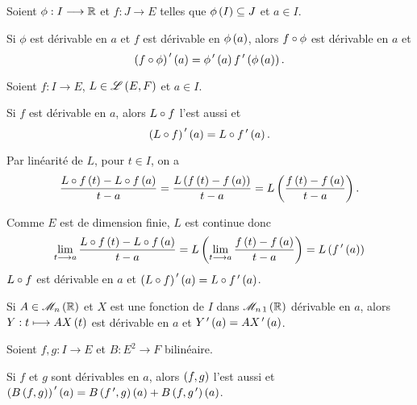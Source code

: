 \begin{prop}
Soient \(\phi:I\longrightarrow\mathbb{R}\) et \(f:J\to E\) telles que \(\phi\left(I\right)\subseteq J\) et \(a\in I\).

Si \(\phi\) est dérivable en \(a\) et \(f\) est dérivable en \(\phi\left(a\right)\), alors \(f\circ\phi\) est dérivable en \(a\) et \[\left(f\circ\phi\right)^{\,\prime}\left(a\right)=\phi^{\,\prime}\left(a\right)f^{\,\prime}\left(\phi\left(a\right)\right).\]
\end{prop}

\begin{prop}
Soient \(f:I\to E\), \(L\in\mathscr{L}\left(E,F\right)\) et \(a\in I\).

Si \(f\) est dérivable en \(a\), alors \(L\circ f\) l'est aussi et \[\left(L\circ f\right)^{\,\prime}\left(a\right)=L\circ f^{\,\prime}\left(a\right).\]
\end{prop}

\begin{dem}
Par linéarité de \(L\), pour \(t\in I\), on a \[\dfrac{L\circ f\left(t\right)-L\circ f\left(a\right)}{t-a}=\dfrac{L\left(f\left(t\right)-f\left(a\right)\right)}{t-a}=L\left(\dfrac{f\left(t\right)-f\left(a\right)}{t-a}\right).\]

Comme \(E\) est de dimension finie, \(L\) est continue donc \[\lim_{t\longrightarrow a}\dfrac{L\circ f\left(t\right)-L\circ f\left(a\right)}{t-a}=L\left(\lim_{t\longrightarrow a}\dfrac{f\left(t\right)-f\left(a\right)}{t-a}\right)=L\left(f^{\,\prime}\left(a\right)\right)\] \ie \(L\circ f\) est dérivable en \(a\) et \(\left(L\circ f\right)^{\,\prime}\left(a\right)=L\circ f^{\,\prime}\left(a\right)\).
\end{dem}

\begin{ex}
Si \(A\in\M{n}[\R]\) et \(X\) est une fonction de \(I\) dans \(\M{n\,1}[\R]\) dérivable en \(a\), alors \(Y:t\longmapsto AX\left(t\right)\) est dérivable en \(a\) et \(Y^{\,\prime}\left(a\right)=AX^{\,\prime}\left(a\right)\).
\end{ex}

\begin{prop}
Soient \(f,g:I\to E\) et \(B:E^2\to F\) bilinéaire.

Si \(f\) et \(g\) sont dérivables en \(a\), alors \(\left(f,g\right)\) l'est aussi et \(\left(B\left(f,g\right)\right)^{\,\prime}\left(a\right)=B\left(f^{\,\prime},g\right)\left(a\right)+B\left(f,g^{\,\prime}\right)\left(a\right)\).
\end{prop}

